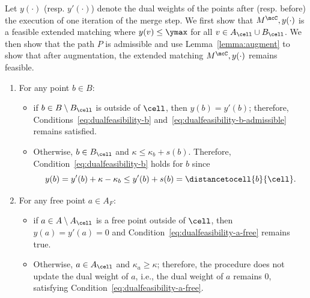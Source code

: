 Let $y(\cdot)$ (resp. $y'(\cdot)$) denote the dual weights of the points after (resp. before) the execution of one iteration of the merge step. We first show that $M^\mcC, y(\cdot)$ is a feasible extended matching where $y(v)\le \ymax$ for all $v\in A_\cell\cup B_\cell$. We then show that the path $P$ is admissible and use Lemma~\ref{lemma:augment} to show that after augmentation, the extended matching $M^\mcC, y(\cdot)$ remains feasible.

    \begin{enumerate}
        \item For any point $b\in B$:
        \begin{itemize}
            \item if $b\in B\setminus B_\cell$ is outside of $\cell$, then $y(b)=y'(b)$; therefore, Conditions~\eqref{eq:dualfeasibility-b} and~\eqref{eq:dualfeasibility-b-admissible} remains satisfied.
            \item Otherwise, $b\in B_\cell$ and $\kappa\le \kappa_b+s(b)$. Therefore, Condition~\eqref{eq:dualfeasibility-b} holds for $b$ since 
            \begin{equation}\label{eq:local-hung-2}
                y(b) = y'(b) + \kappa - \kappa_b \le y'(b) + s(b) =\distancetocell{b}{\cell}. 
            \end{equation}
        \end{itemize}
        \item For any free point $a\in A_F$:
        \begin{itemize}
            \item if $a\in A\setminus A_\cell$ is a free point outside of $\cell$, then $y(a)=y'(a)=0$ and Condition~\eqref{eq:dualfeasibility-a-free} remains true. 
            \item Otherwise, $a\in A_\cell$ and $\kappa_a\ge \kappa$; therefore, the procedure does not update the dual weight of $a$, i.e., the dual weight of $a$ remains $0$, satisfying Condition~\eqref{eq:dualfeasibility-a-free}. 
        \end{itemize}
        
    \end{enumerate}

